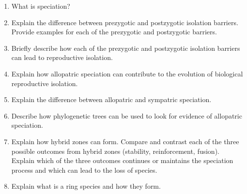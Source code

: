 \documentclass[letterpaper]{tufte-handout}
\begin{document}
\begin{enumerate}

	\item What is speciation?  

	\item Explain 
 the difference between prezygotic and postzygotic isolation barriers. Provide examples for each of the prezygotic and postzygotic barriers.
 
	\item Briefly describe how each of the prezygotic and postzygotic isolation barriers can lead to reproductive isolation.

	\item Explain how allopatric speciation can contribute to the evolution of biological reproductive isolation.
	
	\item Explain the difference between allopatric and sympatric speciation. 
	
	\item Describe how phylogenetic trees can be used to look for evidence of allopatric speciation.
	
	\item Explain how hybrid zones can form. Compare and contrast each of the three possible outcomes from hybrid zones (stability, reinforcement, fusion). Explain which of the three outcomes continues or maintains the speciation process and which can lead to the loss of species.
	
	\item Explain what is a ring species and how they form.


\end{enumerate}
\end{document}
